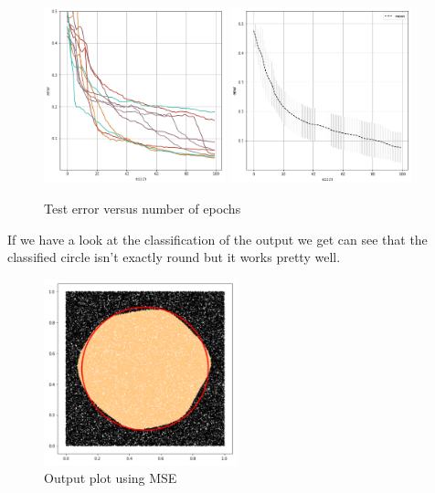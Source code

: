 \documentclass{article}
\begin{document}
\begin{figure}[H]
\begin{center}
\includegraphics[width=0.47\textwidth]{err_mse_sep}
\includegraphics[width=0.47\textwidth]{err_mse}
\caption{Test error versus number of epochs}
\end{center}
\end{figure}

If we have a look at the classification of the output we get can see that the classified circle isn't exactly round but it works pretty well. 

\begin{figure}[H]
\begin{center}
\includegraphics[width=0.5\textwidth]{mse_plot}
\caption{Output plot using MSE}
\end{center}
\end{figure}
\end{document}
